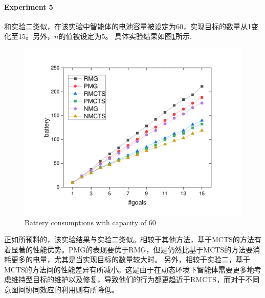 \paragraph{Experiment 5}
和实验二类似，在该实验中智能体的电池容量被设定为60，实现目标的数量从1变化至15。另外，$n$的值被设定为5。
具体实验结果如图\ref{fig:dynamic2}所示.
\begin{figure}[h!]
\centering
\includegraphics[scale=0.4]{./figs/gX_cY_fixCap60_d}
\captionsetup{justification=centering}
\caption{Battery consumptions with capacity of 60}
\label{fig:dynamic2}
\end{figure}

正如所预料的，该实验结果与实验二类似。相较于其他方法，基于MCTS的方法有着显著的性能优势。PMG的表现要优于RMG，但是仍然比基于MCTS的方法要消耗更多的电量，尤其是当实现目标的数量较大时。
%
另外，相较于实验二，基于MCTS的方法间的性能差异有所减小。这是由于在动态环境下智能体需要更多地考虑维持型目标的维护以及修复，导致他们的行为都更趋近于RMCTS，而对于不同意图间协同效应的利用则有所降低。

